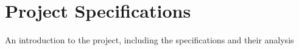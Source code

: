 \chapter{Project Specifications}\label{chapter:1}
An introduction to the project, including the specifications and their analysis
